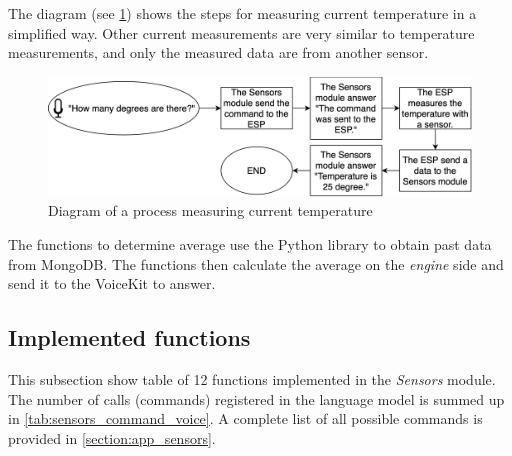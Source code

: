 The diagram (see \cref{fig:measure_sensors_diagram}) shows the steps for measuring current temperature in a simplified way. Other current measurements are very similar to temperature measurements, and only the measured data are from another sensor.

\begin{figure}[H]
    \centering
    \includegraphics[width=\textwidth]{img/measure_sensors_diagram.png}
    \caption{Diagram of a process measuring current temperature}
    \label{fig:measure_sensors_diagram}
\end{figure}

The functions to determine average use the Python library to obtain past data from MongoDB. The functions then calculate the average on the \textit{engine} side and send it to the VoiceKit to answer.

\subsection{Implemented functions}

This subsection show table of 12 functions implemented in the \textit{Sensors} module. The number of calls (commands) registered in the language model is summed up in \cref{tab:sensors_command_voice}. A complete list of all possible commands is provided in \cref{section:app_sensors}.

